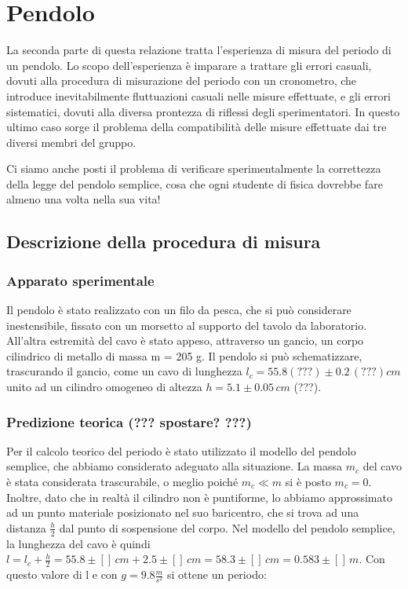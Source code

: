 \section{Pendolo}

La seconda parte di questa relazione tratta l'esperienza di misura del periodo
di un pendolo. Lo scopo dell'esperienza è imparare a trattare gli errori
casuali, dovuti alla procedura di misurazione del periodo con un cronometro,
che introduce inevitabilmente fluttuazioni casuali nelle misure effettuate,
e gli errori sistematici, dovuti alla diversa prontezza di riflessi degli
sperimentatori. In questo ultimo caso sorge il problema della 
compatibilità delle misure effettuate dai tre diversi membri del gruppo.

Ci siamo anche posti il problema di verificare sperimentalmente la
correttezza della legge del pendolo semplice, cosa che ogni studente di
fisica dovrebbe fare almeno una volta nella sua vita!

\subsection{Descrizione della procedura di misura}

\subsubsection{Apparato sperimentale}

Il pendolo è stato realizzato con un filo da pesca, che si può considerare
inestensibile, fissato con un morsetto al supporto del tavolo da laboratorio.
All'altra estremità del cavo è stato appeso, attraverso un gancio, un corpo
cilindrico di metallo di massa m = 205 g. Il pendolo si può schematizzare,
trascurando il gancio, come un cavo di lunghezza $l_c = 55.8 (???) \pm 0.2 \, (???)
cm$ unito ad un cilindro omogeneo di altezza $h = 5.1 \pm 0.05 \, cm$ (???).

\subsubsection{Predizione teorica (??? spostare? ???)}

Per il calcolo teorico del periodo è stato utilizzato il modello del pendolo
semplice, che abbiamo considerato adeguato alla situazione. La massa $m_c$ del
cavo è stata considerata trascurabile, o meglio poiché $m_c \ll m$ si è posto
$m_c = 0$. Inoltre, dato che in realtà
il cilindro non è puntiforme, lo abbiamo approssimato ad un punto
materiale posizionato nel suo baricentro, che si trova ad una distanza
$\frac{h}{2}$ dal punto di sospensione del corpo.
Nel modello del pendolo semplice, la lunghezza del cavo è quindi
$l = l_c + \frac{h}{2} = 55.8 \pm [] \, cm + 2.5 \pm [] \, cm = 58.3 \pm [] \, cm = 0.583 \pm [] \, m$.
Con questo valore di l e con $g = 9.8 \frac{m}{s^2}$ si ottene un periodo:

